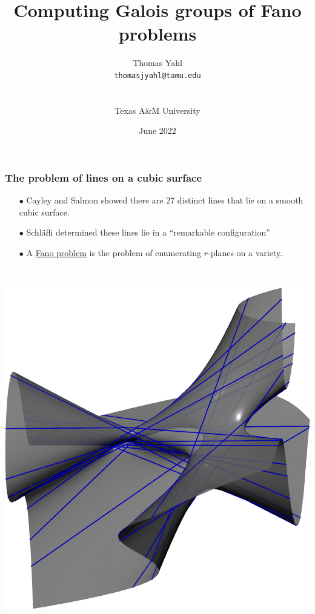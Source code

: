 \documentclass{beamer}
\title{Computing Galois groups of Fano problems}
\author{Thomas Yahl\\  \texttt{thomasjyahl@tamu.edu}\\ \vspace{-.1cm} \\ \vspace{-.1cm} \\ Texas A\&M University}
\date{June 2022}
\theoremstyle{definition}
\newcommand{\blue}[1]{{\color{black!15!blue}\underline{#1}}}
\begin{document}
\begin{frame}
\titlepage

\end{frame}



\begin{frame}
\frametitle{The problem of lines on a cubic surface}
\hspace{-.8cm}
\begin{minipage}{.55\textwidth}
\begin{enumerate}
\item[$\bullet$] Cayley and Salmon showed there are 27 distinct lines that lie on a smooth cubic surface.

\item[$\bullet$] Schl\"{a}fli determined these lines lie in a ``remarkable configuration'' 

\item[$\bullet$] A \blue{Fano problem} is the problem of enumerating $r$-planes on a variety.
\end{enumerate}
\end{minipage}
%
\begin{minipage}{.01\textwidth}
~
\end{minipage}
%
\begin{minipage}{.43\textwidth}
\begin{center}
\includegraphics[scale=.3]{figures/27lines.pdf}
\end{center}
\end{minipage}


\end{frame}
\end{document}
